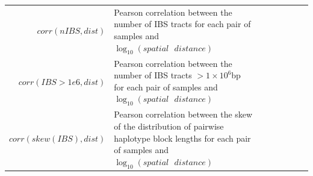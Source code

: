 \documentclass[10pt,twoside,lineno,hidelinks]{preprint} %
\providecommand{\DIFaddbegin}{} %
\providecommand{\DIFaddend}{} %
\begin{document}
\begin{table}
\begin{tabular}{rllrrrrr}
$corr(nIBS,dist)$ & \makecell[l]{Pearson correlation between the number of IBS tracts \\for each pair of samples and $\log_{10}(spatial\text{ }distance)$} \\
$corr(IBS>1e6,dist)$ & \makecell[l]{Pearson correlation between the number of IBS tracts $> 1\times10^6$bp \\for each pair of samples and $\log_{10}(spatial\text{ }distance)$} \\
$corr(skew(IBS),dist)$ & \makecell[l]{Pearson correlation between the skew of the distribution of pairwise haplotype\\ block lengths for each pair of samples and $\log_{10}(spatial\text{ }distance)$} \\
\end{tabular}
\label{table:sumstats}
\end{table}
\DIFaddbegin \FloatBarrier
\DIFaddend 
\end{document}
